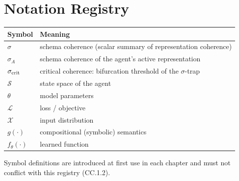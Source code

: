 \chapter*{Notation Registry}

\begin{center}
\begin{tabular}{ll}
\toprule
Symbol & Meaning \\
\midrule
$\sigma$ & schema coherence (scalar summary of representation coherence) \\
$\sigma_A$ & schema coherence of the agent's active representation \\
$\sigma_{\mathrm{crit}}$ & critical coherence: bifurcation threshold of the $\sigma$-trap \\
$\mathcal{S}$ & state space of the agent \\
$\theta$ & model parameters \\
$\mathcal{L}$ & loss / objective \\
$\mathcal{X}$ & input distribution \\
$g(\cdot)$ & compositional (symbolic) semantics \\
$f_\theta(\cdot)$ & learned function \\
\bottomrule
\end{tabular}
\end{center}

\noindent Symbol definitions are introduced at first use in each chapter and must
not conflict with this registry (CC.1.2).
